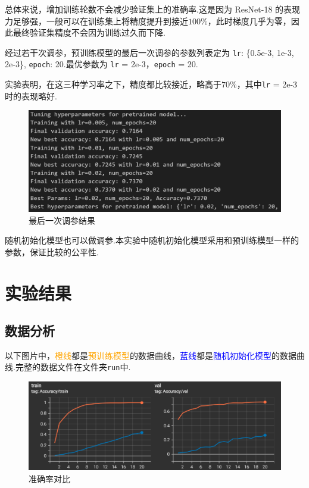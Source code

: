 \documentclass[notitlepage,cs4size,punct,oneside]{ctexrep}
\numberwithin{equation}{chapter}
\theoremstyle{mystyle}
\begin{document}
总体来说，增加训练轮数不会减少验证集上的准确率.这是因为 ResNet-18 的表现力足够强，一般可以在训练集上将精度提升到接近$100\%$，此时梯度几乎为零，因此最终验证集精度不会因为训练过久而下降.

经过若干次调参，预训练模型的最后一次调参的参数列表定为 \texttt{lr}: \{0.5e-3, 1e-3, 2e-3\}, \texttt{epoch}: 20.最优参数为 \texttt{lr} = 2e-3，\texttt{epoch} = 20.

实验表明，在这三种学习率之下，精度都比较接近，略高于$70\%$，其中\texttt{lr} = 2e-3时的表现略好.

\begin{figure}[H]
    \centering
    \includegraphics[scale=0.7]{fine.png}
    \caption{最后一次调参结果}
    \label{fig:fine}
\end{figure}

随机初始化模型也可以做调参.本实验中随机初始化模型采用和预训练模型一样的参数，保证比较的公平性.



\section{实验结果}
\subsection{数据分析}
以下图片中，\textcolor{orange}{橙线}都是\textcolor{orange}{预训练模型}的数据曲线，\textcolor{blue}{蓝线}都是\textcolor{blue}{随机初始化模型}的数据曲线.完整的数据文件在文件夹\texttt{run}中.

\begin{figure}[H]
    \centering
    \includegraphics[scale=0.75]{acc.png}
    \caption{准确率对比}
    \label{fig:acc}
\end{figure}
\end{document}
